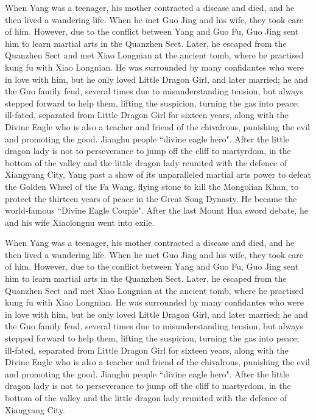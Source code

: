 \documentclass[print, doctor, vlined]{DissertUESTC}
\begin{document}

	
	

	
	
	\enabstract
	
	When Yang was a teenager, his mother contracted a disease and died, and he then lived a wandering life. When he met Guo Jing and his wife, they took care of him. However, due to the conflict between Yang and Guo Fu, Guo Jing sent him to learn martial arts in the Quanzhen Sect. Later, he escaped from the Quanzhen Sect and met Xiao Longnian at the ancient tomb, where he practised kung fu with Xiao Longnian. He was surrounded by many confidantes who were in love with him, but he only loved Little Dragon Girl, and later married; he and the Guo family feud, several times due to misunderstanding tension, but always stepped forward to help them, lifting the suspicion, turning the gas into peace; ill-fated, separated from Little Dragon Girl for sixteen years, along with the Divine Eagle who is also a teacher and friend of the chivalrous, punishing the evil and promoting the good. Jianghu people ``divine eagle hero". After the little dragon lady is not to perseverance to jump off the cliff to martyrdom, in the bottom of the valley and the little dragon lady reunited with the defence of Xiangyang City, Yang past a show of its unparalleled martial arts power to defeat the Golden Wheel of the Fa Wang, flying stone to kill the Mongolian Khan, to protect the thirteen years of peace in the Great Song Dynasty. He became the world-famous ``Divine Eagle Couple". After the last Mount Hua sword debate, he and his wife Xiaolongnu went into exile.

	When Yang was a teenager, his mother contracted a disease and died, and he then lived a wandering life. When he met Guo Jing and his wife, they took care of him. However, due to the conflict between Yang and Guo Fu, Guo Jing sent him to learn martial arts in the Quanzhen Sect. Later, he escaped from the Quanzhen Sect and met Xiao Longnian at the ancient tomb, where he practised kung fu with Xiao Longnian. He was surrounded by many confidantes who were in love with him, but he only loved Little Dragon Girl, and later married; he and the Guo family feud, several times due to misunderstanding tension, but always stepped forward to help them, lifting the suspicion, turning the gas into peace; ill-fated, separated from Little Dragon Girl for sixteen years, along with the Divine Eagle who is also a teacher and friend of the chivalrous, punishing the evil and promoting the good. Jianghu people ``divine eagle hero". After the little dragon lady is not to perseverance to jump off the cliff to martyrdom, in the bottom of the valley and the little dragon lady reunited with the defence of Xiangyang City.
\end{document}

